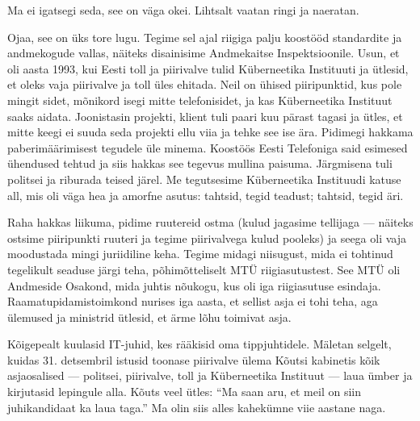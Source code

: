 
Ma ei igatsegi seda, see on väga okei. Lihtsalt vaatan 
ringi ja naeratan. 


Ojaa, see on üks tore lugu. Tegime sel ajal
riigiga palju koostööd standardite ja andmekogude 
vallas, näiteks disainisime Andmekaitse Inspektsioonile. 
Usun, et oli aasta 1993, kui Eesti toll ja piirivalve tulid Küberneetika Instituuti ja ütlesid, et 
oleks vaja piirivalve ja toll üles ehitada. Neil on 
ühised piiripunktid, kus pole mingit sidet, mõnikord isegi mitte 
telefonisidet, ja kas Küberneetika Instituut saaks aidata. 
Joonistasin projekti, klient tuli paari kuu pärast tagasi ja ütles, et mitte keegi ei 
suuda seda projekti ellu viia ja tehke see ise ära. 
Pidimegi hakkama paberimäärimisest tegudele üle minema. 
Koostöös Eesti Telefoniga 
said esimesed ühendused tehtud ja siis hakkas see tegevus mullina 
paisuma. Järgmisena tuli politsei ja riburada teised järel. Me 
tegutsesime Küberneetika Instituudi katuse all, mis oli väga hea ja
amorfne asutus: tahtsid, tegid teadust; tahtsid, tegid äri.

Raha hakkas liikuma, pidime ruutereid 
ostma (kulud jagasime tellijaga --- näiteks ostsime piiripunkti ruuteri ja tegime piirivalvega kulud pooleks) ja seega oli vaja moodustada mingi juriidiline keha. Tegime midagi niisugust, mida 
ei tohtinud tegelikult seaduse järgi teha, põhimõtteliselt MTÜ riigiasutustest. 
See MTÜ oli Andmeside Osakond, mida juhtis nõukogu, kus oli iga riigiasutuse esindaja.
Raamatupidamistoimkond nurises iga aasta, et sellist asja ei tohi teha, aga 
ülemused ja ministrid ütlesid, et ärme lõhu 
toimivat asja.


Kõigepealt kuulasid IT-juhid, kes rääkisid oma tippjuhtidele. 
Mäletan selgelt, kuidas 31. detsembril istusid toonase 
piirivalve ülema Kõutsi 
kabinetis kõik asjaosalised --- politsei, piirivalve, toll ja Küberneetika 
Instituut --- laua ümber ja kirjutasid lepingule alla. Kõuts veel ütles: \enquote{Ma saan aru, et meil on siin juhikandidaat ka laua taga.} Ma olin siis alles kahekümne viie aastane naga. 

